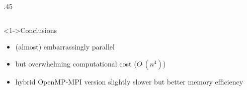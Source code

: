 \documentclass{beamer}
\newcommand{\SO}[1]{\ensuremath{O\tilde\ (#1)}\xspace}
\begin{document}
\begin{frame}
\begin{columns}
\begin{column} {.45\textwidth}
\begin{center}
        \end{center}
      \end{column}
      \end{columns}
      \begin{block}<1->{Conclusions}
        \begin{itemize}
        \item (almost) embarrassingly parallel
        \item but overwhelming computational cost ($\SO{n^4}$)
        \item hybrid OpenMP-MPI version slightly slower but better memory efficiency
        \end{itemize}
      \end{block}
\end{frame}

\end{document}
